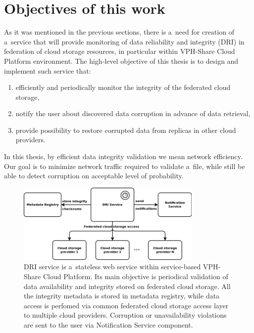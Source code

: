 \section{Objectives of this work}

As it was mentioned in the previous sections, there is a~need for creation of a~service that
will provide monitoring of data reliability and integrity (DRI) in federation of cloud storage
resources, in particular within VPH-Share Cloud Platform environment. The high-level objective of this
thesis is to design and implement such service that:

\begin{enumerate}
\item efficiently and  periodically monitor the integrity of the federated cloud storage,
\item notify the user about discovered data corruption in advance of data retrieval, 
\item provide possibility to restore corrupted data from replicas in other cloud providers.
\end{enumerate}

In this thesis, by efficient data integrity validation we mean network efficiency. Our goal is to minimize network
traffic required to validate a~file, while still be able to detect corruption on acceptable
level of probability.\\


\begin{figure}[h!]
	\centering
	\includegraphics[width=0.8\textwidth]{images/DRI-objectives.png}
	\caption{DRI service is a~stateless web service within service-based VPH-Share Cloud Platform.
	Its main objective is periodical validation of data availability and integrity stored on
	federated cloud storage. All the integrity metadata is stored in metadata registry, while data access
	is perfomed via common federated cloud storage access layer to multiple cloud providers. Corruption
	or unavailability violations are sent to the user via Notification Service component.}
	\label{fig:dri-objectives}
\end{figure} 

